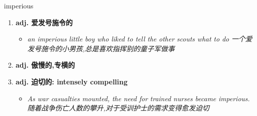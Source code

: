 
\begin{frame}
{\huge imperious}
\begin{center}
\begin{enumerate}\Large
  \item \textbf{adj. 爱发号施令的}
  \begin{itemize}
    \item \em{\Large{an imperious little boy who liked to tell the other scouts what to do 一个爱发号施令的小男孩,总是喜欢指挥别的童子军做事}}
  \end{itemize}
  \item \textbf{adj. 傲慢的,专横的}
  \item \textbf{adj. 迫切的: intensely compelling}
  \begin{itemize}
    \item \em{\Large{As war casualties mounted, the need for trained nurses became imperious. 随着战争伤亡人数的攀升,对于受训护士的需求变得愈发迫切}}
  \end{itemize}
\end{enumerate}
\end{center}
\end{frame}

